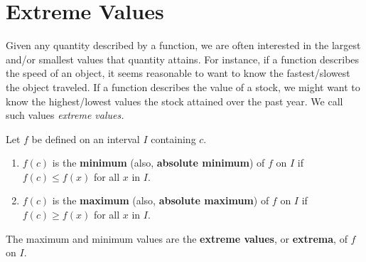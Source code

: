 \section{Extreme Values}\label{sec:extreme_values}


Given any quantity described by a function, we are often interested in the largest and/or smallest values that quantity attains. For instance, if a function describes the speed of an object, it seems reasonable to want to know the fastest/slowest the object traveled. If a function describes the value of a stock, we might want to know the highest/lowest values the stock attained over the past year. We call such values \emph{extreme values.}

\begin{definition}\label{def:extreme_values}
Let $f$ be defined on an interval $I$ containing $c$.
\begin{enumerate}
	\item	$f(c)$ is the \textbf{minimum} (also, \textbf{absolute minimum}) of $f$ on $I$ if $f(c) \leq f(x)$ for all $x$ in $I$.
	\item	$f(c)$ is the \textbf{maximum} (also, \textbf{absolute maximum}) of $f$ on $I$ if $f(c) \geq f(x)$ for all $x$ in $I$.
\end{enumerate}
The maximum and minimum values are the \textbf{extreme values}, or \textbf{extrema}, of $f$ on $I$.
\end{definition}

